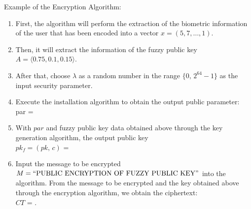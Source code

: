 \documentclass[graybox]{svmult}
\begin{document}
Example of the Encryption Algorithm:
\begin{enumerate}[itemsep=1em]
    \item First, the algorithm will perform the extraction of the biometric information of the user that has been encoded into a vector \( x = (5, 7, \dots, 1) \).
    \item Then, it will extract the information of the fuzzy public key \( A = \langle 0.75, 0.1, 0.15 \rangle \).
    \item After that, choose \( \lambda \) as a random number in the range \( \{0, \, 2^{64} - 1\} \) as the input security parameter.
    \item Execute the installation algorithm to obtain the output public parameter:\\
          par =


    \item With \( par \) and fuzzy public key data obtained above through the key generation algorithm, the output public key \\ \( pk_f = (pk, \, c) \) =

    \item Input the message to be encrypted \\ \( M = \text{\textquotedblleft PUBLIC ENCRYPTION OF FUZZY PUBLIC KEY\textquotedblright} \) into the algorithm. From the message to be encrypted and the key obtained above through the encryption algorithm, we obtain the ciphertext:\\ \( CT \)
          =  .
\end{enumerate}
\end{document}
